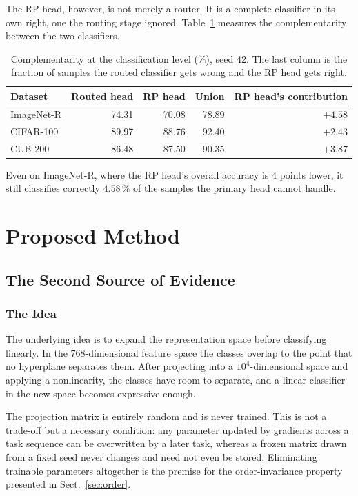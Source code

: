 \documentclass[11pt,a4paper]{article}
\begin{document}
The RP head, however, is not merely a router. It is a complete classifier in its
own right, one the routing stage ignored. Table~\ref{tab:cls} measures the
complementarity between the two classifiers.

\begin{table}[htbp]
\centering
\caption{Complementarity at the classification level (\%), seed 42. The last
column is the fraction of samples the routed classifier gets wrong and the RP
head gets right.}
\label{tab:cls}
\begin{tabular}{lrrrr}
\toprule
Dataset & Routed head & RP head & Union & RP head's contribution \\
\midrule
ImageNet-R & 74.31 & 70.08 & 78.89 & $+4.58$ \\
CIFAR-100  & 89.97 & 88.76 & 92.40 & $+2.43$ \\
CUB-200    & 86.48 & 87.50 & 90.35 & $+3.87$ \\
\bottomrule
\end{tabular}
\end{table}

Even on ImageNet-R, where the RP head's overall accuracy is $4$ points lower, it
still classifies correctly $4.58\,\%$ of the samples the primary head cannot
handle.

\section{Proposed Method}

\subsection{The Second Source of Evidence}

\subsubsection{The Idea}

The underlying idea is to expand the representation space before classifying
linearly. In the $768$-dimensional feature space the classes overlap to the
point that no hyperplane separates them. After projecting into a
$10^4$-dimensional space and applying a nonlinearity, the classes have room to
separate, and a linear classifier in the new space becomes expressive enough.

The projection matrix is entirely random and is never trained. This is not a
trade-off but a necessary condition: any parameter updated by gradients across a
task sequence can be overwritten by a later task, whereas a frozen matrix drawn
from a fixed seed never changes and need not even be stored. Eliminating
trainable parameters altogether is the premise for the order-invariance property
presented in Sect.~\ref{sec:order}.
\end{document}

